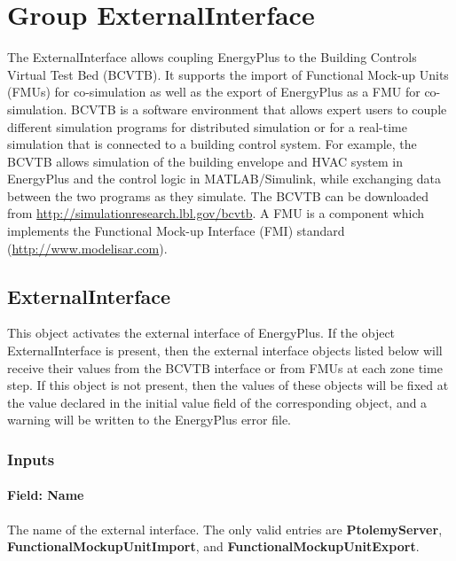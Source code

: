 \section{Group ExternalInterface}\label{group-externalinterface}

The ExternalInterface allows coupling EnergyPlus to the Building Controls Virtual Test Bed (BCVTB). It supports the import of Functional Mock-up Units (FMUs) for co-simulation as well as the export of EnergyPlus as a FMU for co-simulation. BCVTB is a software environment that allows expert users to couple different simulation programs for distributed simulation or for a real-time simulation that is connected to a building control system. For example, the BCVTB allows simulation of the building envelope and HVAC system in EnergyPlus and the control logic in MATLAB/Simulink, while exchanging data between the two programs as they simulate. The BCVTB can be downloaded from \url{http://simulationresearch.lbl.gov/bcvtb}. A FMU is a component which implements the Functional Mock-up Interface (FMI) standard (\url{http://www.modelisar.com}).

\subsection{ExternalInterface}\label{externalinterface}

This object activates the external interface of EnergyPlus. If the object ExternalInterface is present, then the external interface objects listed below will receive their values from the BCVTB interface or from FMUs at each zone time step. If this object is not present, then the values of these objects will be fixed at the value declared in the initial value field of the corresponding object, and a warning will be written to the EnergyPlus error file.

\subsubsection{Inputs}\label{inputs-018}

\paragraph{Field: Name}\label{field-name-017}

The name of the external interface. The only valid entries are \textbf{PtolemyServer}, \textbf{FunctionalMockupUnitImport}, and \textbf{FunctionalMockupUnitExport}.


